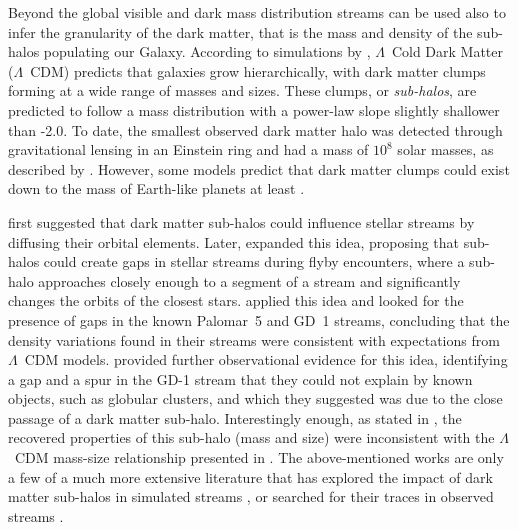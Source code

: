\documentclass{aa}
\begin{document}
  
  Beyond the global visible and dark mass distribution streams can be used also to infer the granularity of the dark matter, that is the mass and density of the sub-halos populating our Galaxy. According to simulations by \citet{2008MNRAS.391.1685S}, $\Lambda$~Cold Dark Matter ($\Lambda$~CDM) predicts that galaxies grow hierarchically, with dark matter clumps forming at a wide range of masses and sizes. These clumps, or \textit{sub-halos}, are predicted to follow a mass distribution with a power-law slope slightly shallower than -2.0. To date, the smallest observed dark matter halo was detected through gravitational lensing in an Einstein ring and had a mass of $10^8$ solar masses, as described by \citet{2012Natur.481..341V}. However, some models predict that dark matter clumps could exist down to the mass of Earth-like planets at least \citep[see][ and discussion in \citet{2021arXiv211101148A} ]{2005JCAP...08..003G}. 

  \citet{2002MNRAS.332..915I} first suggested that dark matter sub-halos could influence stellar streams by diffusing their orbital elements. Later, \citet{2012ApJ...748...20C} expanded this idea, proposing that sub-halos could create gaps in stellar streams during flyby encounters, where a sub-halo approaches closely enough to a segment of a stream and significantly changes the orbits of the closest stars.  \citet{2012ApJ...760...75C, 2013ApJ...768..171C} applied this idea and looked for the presence of gaps in the known Palomar~5 and GD~1 streams, concluding that the density variations found in their streams were consistent with expectations from $\Lambda$~CDM models.  \citet{2019ApJ...880...38B} provided further observational evidence for this idea, identifying a gap and a spur in the GD-1 stream that they could not explain by known objects, such as globular clusters, and which they suggested was due to the close passage of a dark matter sub-halo. Interestingly enough, as stated in \citet{2019ApJ...880...38B}, the recovered properties of this sub-halo (mass and size) were inconsistent with the $\Lambda$~CDM mass-size relationship presented in \cite{2017MNRAS.466.4974M}. The above-mentioned works are only a few of a much more extensive literature that has explored the impact of dark matter sub-halos in simulated streams \citep{2016ApJ...828L..10H, 2021MNRAS.507.1999H, 2021JCAP...10..043B, 2024arXiv240402953H, 2024arXiv241021174N}, or searched for their traces in observed streams \citep{2016MNRAS.460.2711T, 2017MNRAS.470...60E, 2020ApJ...889...70B, 2020ApJ...892L..37B}.
\end{document}
